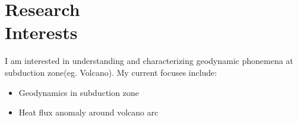 \documentclass{mycv}
\begin{document}
\maketitle%

\section{Research \\ Interests}

I am interested in understanding and characterizing geodynamic phonemena at subduction zone(eg. Volcano). My current focuses include:

\begin{itemize}
  \item Geodynamics in subduction zone
  \item Heat flux anomaly around volcano arc
\end{itemize}
\end{document}

